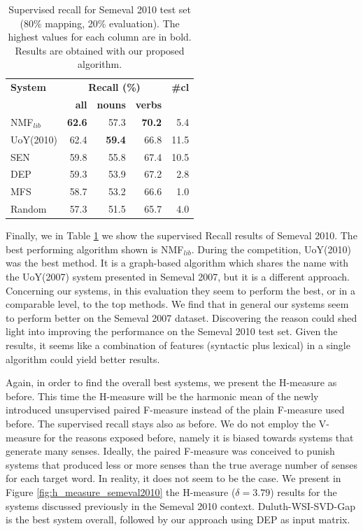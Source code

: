 \begin{table}[!tb]
\centering
\caption{Supervised recall  for Semeval 2010 test set (80\% mapping, 20\% evaluation). The highest values for each column are in bold. Results are obtained with our proposed algorithm.}
\begin{tabular}{@{}lrrrr@{}}
\toprule
\textbf{System} & \multicolumn{3}{c}{\textbf{Recall (\%)}} & \textbf{\#cl}  \\
 & \textbf{all} & \textbf{nouns} & \textbf{verbs} & \\ \midrule
NMF$_{lib}$&\textbf{62.6}&57.3&\textbf{70.2} & 5.4\\
UoY(2010) & 62.4 & \textbf{59.4} & 66.8 & 11.5\\

SEN & 59.8 & 55.8 & 67.4 & 10.5\\
DEP & 59.3 & 53.9 & 67.2 & 2.8\\
MFS & 58.7 & 53.2 & 66.6 & 1.0\\
Random & 57.3 & 51.5 & 65.7 & 4.0\\ \bottomrule

\end{tabular}


\label{tab:sem2010_SR}
\end{table}


Finally, we in Table \ref{tab:sem2010_SR} we show the supervised Recall results of Semeval 2010. The best performing algorithm shown is NMF$_{lib}$. During the competition, UoY(2010) was the best method. It is a graph-based algorithm which shares the name with the UoY(2007)  system presented in Semeval 2007, but it is a different  approach. Concerning our systems, in this evaluation they seem to perform the best, or in a comparable level, to the top methods.  We find that in general our systems seem to perform better on the Semeval 2007 dataset. Discovering the reason could shed light into improving the performance on the Semeval 2010 test set. Given the results, it seems like a combination of features (syntactic plus lexical) in  a single algorithm could yield better results. 

Again, in order to find the overall best systems, we present the H-measure as before. This time the H-measure will be the harmonic mean of the newly introduced unsupervised paired F-measure instead of the plain F-measure used before. The supervised recall stays also as before. We do not employ the V-measure for the reasons exposed before, namely it is biased towards systems that generate many senses. Ideally, the paired F-measure was conceived to punish systems that produced less or more senses than the true average number of senses for each target word. In reality, it does not seem to be the case. We present in Figure \ref{fig:h_measure_semeval2010} the H-measure ($\delta=3.79$) results for the systems discussed previously in the Semeval 2010 context. Duluth-WSI-SVD-Gap is the best system overall, followed by our approach using DEP as input matrix. 

